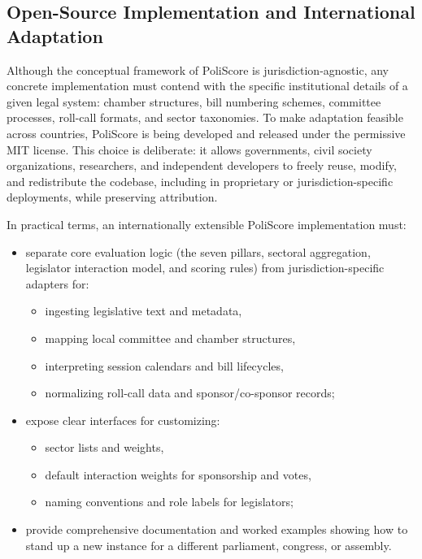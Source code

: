 \documentclass[12pt]{article}
\begin{document}
\subsection{Open-Source Implementation and International Adaptation}

Although the conceptual framework of PoliScore is jurisdiction-agnostic, any concrete implementation must contend with the
specific institutional details of a given legal system: chamber structures, bill numbering schemes, committee processes,
roll-call formats, and sector taxonomies. To make adaptation feasible across countries, PoliScore is being developed and
released under the permissive MIT license. This choice is deliberate: it allows governments, civil society organizations,
researchers, and independent developers to freely reuse, modify, and redistribute the codebase, including in proprietary
or jurisdiction-specific deployments, while preserving attribution.

In practical terms, an internationally extensible PoliScore implementation must:

\begin{itemize}
    \item separate core evaluation logic (the seven pillars, sectoral aggregation, legislator interaction model, and scoring
    rules) from jurisdiction-specific adapters for:
    \begin{itemize}
        \item ingesting legislative text and metadata,
        \item mapping local committee and chamber structures,
        \item interpreting session calendars and bill lifecycles,
        \item normalizing roll-call data and sponsor/co-sponsor records;
    \end{itemize}
    \item expose clear interfaces for customizing:
    \begin{itemize}
        \item sector lists and weights,
        \item default interaction weights for sponsorship and votes,
        \item naming conventions and role labels for legislators;
    \end{itemize}
    \item provide comprehensive documentation and worked examples showing how to stand up a new instance for a different
    parliament, congress, or assembly.
\end{itemize}
\end{document}
